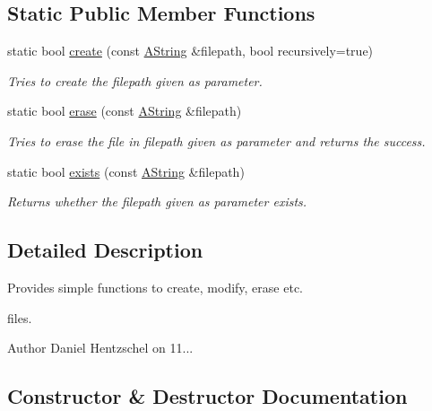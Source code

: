 \subsection*{Static Public Member Functions}
\begin{DoxyCompactItemize}
\item 
static bool \mbox{\hyperlink{class_file_a255061b2a5ed2db1c9f8fce9ab78af4e}{create}} (const \mbox{\hyperlink{class_a_string}{A\+String}} \&filepath, bool recursively=true)
\begin{DoxyCompactList}\small\item\em Tries to create the filepath given as parameter. \end{DoxyCompactList}\item 
static bool \mbox{\hyperlink{class_file_a068634b55657c13f0f79691434c399b1}{erase}} (const \mbox{\hyperlink{class_a_string}{A\+String}} \&filepath)
\begin{DoxyCompactList}\small\item\em Tries to erase the file in filepath given as parameter and returns the success. \end{DoxyCompactList}\item 
static bool \mbox{\hyperlink{class_file_a7b28f74e97c46f0b95ec159c2425dca0}{exists}} (const \mbox{\hyperlink{class_a_string}{A\+String}} \&filepath)
\begin{DoxyCompactList}\small\item\em Returns whether the filepath given as parameter exists. \end{DoxyCompactList}\end{DoxyCompactItemize}


\subsection{Detailed Description}
Provides simple functions to create, modify, erase etc. 

files.

\begin{DoxyAuthor}{Author}
Daniel Hentzschel on 11... 
\end{DoxyAuthor}


\subsection{Constructor \& Destructor Documentation}
\mbox{\label{class_file_a59bf1e7bb0c6b8dd83dccef6b942a0f9}} 
